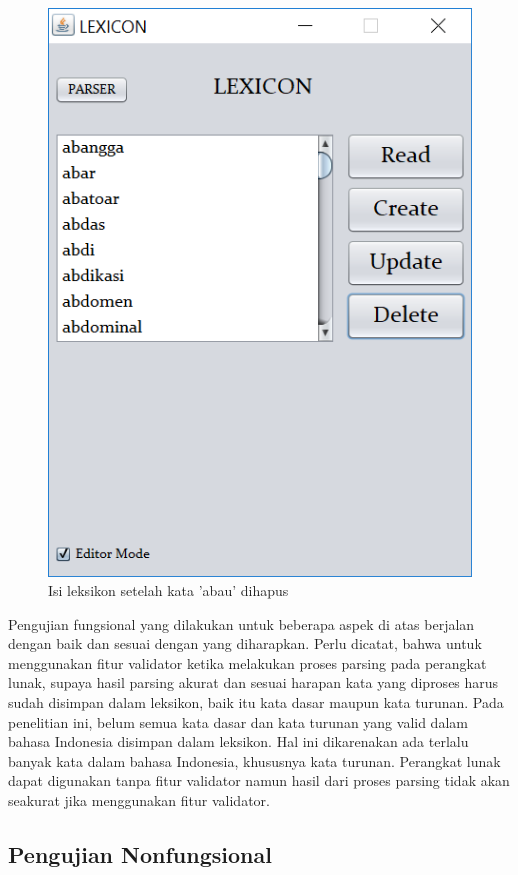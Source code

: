 \begin{figure}[H]
\centering
\includegraphics[scale=0.7]{Gambar/delete-abau-setelah}
\caption{Isi leksikon setelah kata 'abau' dihapus} 
\label{delete-abau-setelah}
\end{figure}

Pengujian fungsional yang dilakukan untuk beberapa aspek di atas berjalan dengan baik dan sesuai dengan yang diharapkan. Perlu dicatat, bahwa untuk menggunakan fitur validator ketika melakukan proses parsing pada perangkat lunak, supaya hasil parsing akurat dan sesuai harapan kata yang diproses harus sudah disimpan dalam leksikon, baik itu kata dasar maupun kata turunan. Pada penelitian ini, belum semua kata dasar dan kata turunan yang valid dalam bahasa Indonesia disimpan dalam leksikon. Hal ini dikarenakan ada terlalu banyak kata dalam bahasa Indonesia, khususnya kata turunan. Perangkat lunak dapat digunakan tanpa fitur validator namun hasil dari proses parsing tidak akan seakurat jika menggunakan fitur validator.

\subsection{Pengujian Nonfungsional}
\label{sec:pengujianNonfungsional}

